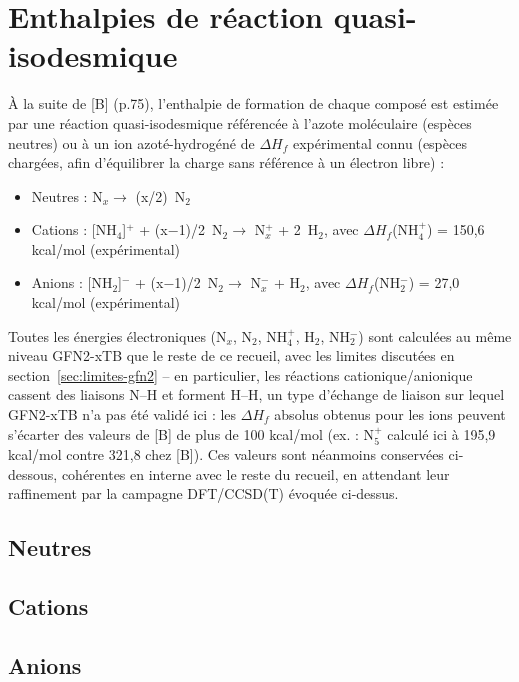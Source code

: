 \documentclass[11pt,a4paper]{article}
\begin{document}
\section{Enthalpies de r\'eaction quasi-isodesmique}
\label{sec:isodesmic}

\`A la suite de [B] (p.75), l'enthalpie de formation de chaque compos\'e
est estim\'ee par une r\'eaction quasi-isodesmique r\'ef\'erenc\'ee \`a
l'azote mol\'eculaire (esp\`eces neutres) ou \`a un ion azot\'e-hydrog\'en\'e
de $\Delta H_f$ exp\'erimental connu (esp\`eces charg\'ees, afin
d'\'equilibrer la charge sans r\'ef\'erence \`a un \'electron libre) :

\begin{itemize}
  \item Neutres : N$_x \to$ (x/2)~N$_2$
  \item Cations : [NH$_4$]$^+$ + (x$-$1)/2~N$_2 \to$ N$_x^+$ + 2~H$_2$,
        avec $\Delta H_f$(NH$_4^+$) = 150{,}6 kcal/mol (exp\'erimental)
  \item Anions : [NH$_2$]$^-$ + (x$-$1)/2~N$_2 \to$ N$_x^-$ + H$_2$,
        avec $\Delta H_f$(NH$_2^-$) = 27{,}0 kcal/mol (exp\'erimental)
\end{itemize}

Toutes les \'energies \'electroniques (N$_x$, N$_2$, NH$_4^+$, H$_2$,
NH$_2^-$) sont calcul\'ees au m\^eme niveau GFN2-xTB que le reste de ce
recueil, avec les limites discut\'ees en section~\ref{sec:limites-gfn2} --
en particulier, les r\'eactions cationique/anionique cassent des liaisons
N--H et forment H--H, un type d'\'echange de liaison sur lequel GFN2-xTB
n'a pas \'et\'e valid\'e ici : les $\Delta H_f$ absolus obtenus pour les
ions peuvent s'\'ecarter des valeurs de [B] de plus de 100 kcal/mol (ex. :
N$_5^{+}$ calcul\'e ici \`a 195{,}9 kcal/mol contre 321{,}8 chez [B]). Ces
valeurs sont n\'eanmoins conserv\'ees ci-dessous, coh\'erentes en interne
avec le reste du recueil, en attendant leur raffinement par la campagne
DFT/CCSD(T) \'evoqu\'ee ci-dessus.

\subsection{Neutres}


\subsection{Cations}


\subsection{Anions}

\end{document}
